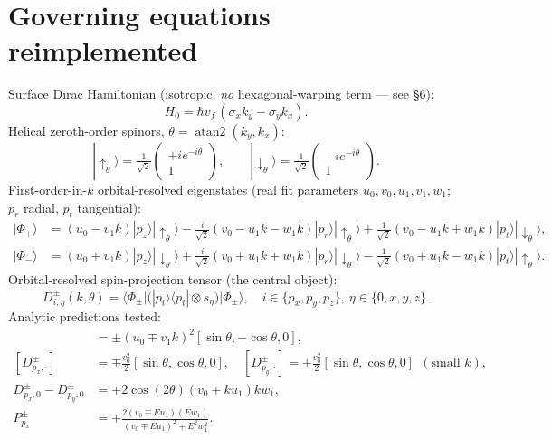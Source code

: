 \documentclass[11pt]{article}
\begin{document}
\section{Governing equations reimplemented}
Surface Dirac Hamiltonian (isotropic; \emph{no} hexagonal-warping term --- see \S6):
\begin{equation}
H_0=\hbar v_f\,(\sigma_x k_y-\sigma_y k_x).
\end{equation}
Helical zeroth-order spinors, $\theta=\operatorname{atan2}(k_y,k_x)$:
\begin{equation}
|\!\uparrow_\theta\rangle=\tfrac{1}{\sqrt2}\begin{pmatrix}+i e^{-i\theta}\\ 1\end{pmatrix},\qquad
|\!\downarrow_\theta\rangle=\tfrac{1}{\sqrt2}\begin{pmatrix}-i e^{-i\theta}\\ 1\end{pmatrix}.
\end{equation}
First-order-in-$k$ orbital-resolved eigenstates (real fit parameters $u_0,v_0,u_1,v_1,w_1$;
$p_r$ radial, $p_t$ tangential):
\begin{align}
|\Phi_+\rangle&=(u_0-v_1k)|p_z\rangle|\!\uparrow_\theta\rangle
-\tfrac{i}{\sqrt2}(v_0-u_1k-w_1k)|p_r\rangle|\!\uparrow_\theta\rangle
+\tfrac{1}{\sqrt2}(v_0-u_1k+w_1k)|p_t\rangle|\!\downarrow_\theta\rangle,\\
|\Phi_-\rangle&=(u_0+v_1k)|p_z\rangle|\!\downarrow_\theta\rangle
+\tfrac{i}{\sqrt2}(v_0+u_1k+w_1k)|p_r\rangle|\!\downarrow_\theta\rangle
-\tfrac{1}{\sqrt2}(v_0+u_1k-w_1k)|p_t\rangle|\!\uparrow_\theta\rangle.
\end{align}
Orbital-resolved spin-projection tensor (the central object):
\begin{equation}
D^{\pm}_{i,\eta}(k,\theta)=\big\langle\Phi_\pm\big|\big(|p_i\rangle\langle p_i|\otimes s_\eta\big)\big|\Phi_\pm\big\rangle,
\quad i\in\{p_x,p_y,p_z\},\ \eta\in\{0,x,y,z\}.
\end{equation}
Analytic predictions tested:
\begin{align}
[D^{\pm}_{p_z,x},D^{\pm}_{p_z,y},D^{\pm}_{p_z,z}]&=\pm(u_0\mp v_1k)^2[\sin\theta,-\cos\theta,0],\\
[D^{\pm}_{p_x,\cdot}]&=\mp\tfrac{v_0^2}{2}[\sin\theta,\cos\theta,0],\quad
[D^{\pm}_{p_y,\cdot}]=\pm\tfrac{v_0^2}{2}[\sin\theta,\cos\theta,0]\ \ (\text{small }k),\\
D^{\pm}_{p_x,0}-D^{\pm}_{p_y,0}&=\mp2\cos(2\theta)(v_0\mp k u_1)k w_1,\\
P_{p_x}^{\pm}&=\mp\frac{2(v_0\mp E u_1)(E w_1)}{(v_0\mp E u_1)^2+E^2 w_1^2}. \tag{Eq.10}
\end{align}
\end{document}

